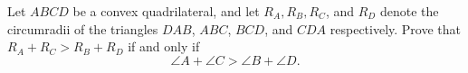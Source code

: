 Let $ABCD$ be a convex quadrilateral, and let $R_A, R_B, R_C$, and $R_D$ denote the circumradii of the triangles $DAB$, $ABC$, $BCD$, and $CDA$ respectively. Prove that $R_A + R_C > R_B + R_D$ if and only if
\[ \angle A + \angle C > \angle B + \angle D. \]
